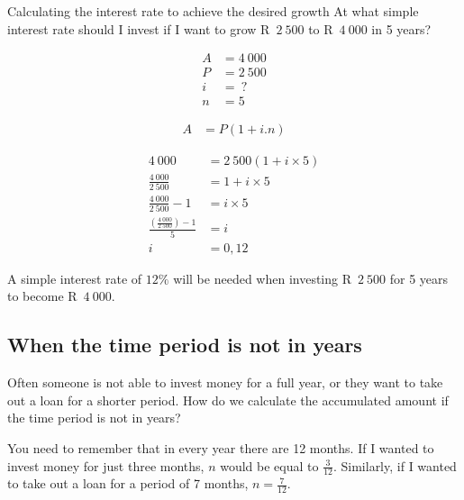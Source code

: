 \begin{wex}{Calculating the interest rate to achieve the desired growth}{
    At what simple interest rate should I invest if I want to grow R~$2~500$ to R~$4~000$ in 5 years?}{

    \begin{align*}
	A &= 4~000\\
	P &= 2~500\\
	i &= ~?\\
	n &= 5
    \end{align*}

    \begin{align*}
	A &= P(1 + i . n)
    \end{align*}

    \begin{align*}
	4~000 &= 2~500(1 + i \times 5)\\
	\frac{4~000}{2~500} &= 1 + i \times 5\\[5pt]
	\frac{4~000}{2~500} - 1&= i \times 5\\[5pt]
	\frac{(\frac{4~000}{2~500}) - 1}{5} &= i\\
	i &= 0,12
    \end{align*}

    A simple interest rate of $12\%$ will be needed when investing R~$2~500$ for 5 years to become R~$4~000$.
    }
\end{wex}


\subsection{When the time period is not in years}

Often someone is not able to invest money for a full year, or they want to take out a loan for a shorter period. How do we calculate the accumulated amount if the time period is not in years?\par

You need to remember that in every year there are 12 months. If I wanted to invest money for just three months, $n$ would be equal to $\frac{3}{12}$. Similarly, if I wanted to take out a loan for a period of 7 months, $n = \frac{7}{12}$.\\


